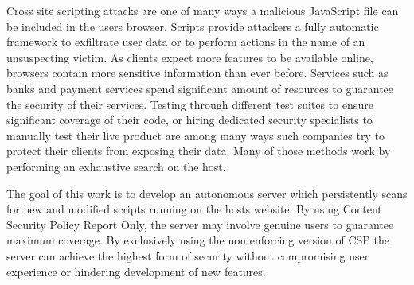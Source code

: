 Cross site scripting attacks are one of many ways a malicious JavaScript file can be included in the users browser. 
Scripts provide attackers a fully automatic framework to exfiltrate user data or to perform actions in the name of an unsuspecting victim.
As clients expect more features to be available online, browsers contain more sensitive information than ever before.
Services such as banks and payment services spend significant amount of resources to guarantee the security of their services.
Testing through different test suites to ensure significant coverage of their code, or hiring dedicated security specialists to manually test their live product are among many ways such companies try to protect their clients from exposing their data.
Many of those methods work by performing an exhaustive search on the host. 

The goal of this work is to develop an autonomous server which persistently scans for new and modified scripts running on the hosts website.
By using Content Security Policy Report Only, the server may involve genuine users to guarantee maximum coverage.
By exclusively using the non enforcing version of CSP the server can achieve the highest form of security without compromising user experience or hindering development of new features.


